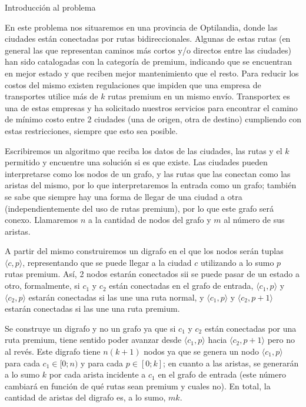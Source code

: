 

\begin{subsection}{Introducción al problema}

En este problema nos situaremos en una provincia de Optilandia, donde las ciudades están conectadas por rutas bidireccionales. Algunas de estas rutas (en general las que representan caminos más cortos y/o directos entre las ciudades) han sido catalogadas con la categoría de premium, indicando que se encuentran en mejor estado y que reciben mejor mantenimiento que el resto. Para reducir los costos del mismo existen regulaciones que impiden que una empresa de transportes utilice más de $k$ rutas premium en un mismo envío. Transportex es una de estas empresas y ha solicitado nuestros servicios para encontrar el camino de mínimo costo entre 2 ciudades (una de origen, otra de destino) cumpliendo con estas restricciones, siempre que esto sea posible.

Escribiremos un algoritmo que reciba los datos de las ciudades, las rutas y el $k$ permitido y encuentre una solución si es que existe. Las ciudades pueden interpretarse como los nodos de un grafo, y las rutas que las conectan como las aristas del mismo, por lo que interpretaremos la entrada como un grafo; también se sabe que siempre hay una forma de llegar de una ciudad a otra (independientemente del uso de rutas premium), por lo que este grafo será conexo. Llamaremos $n$ a la cantidad de nodos del grafo y $m$ al número de sus aristas. 

A partir del mismo construiremos un digrafo en el que los nodos serán tuplas  $\langle c, p \rangle$, representando que se puede llegar a la ciudad $c$ utilizando a lo sumo $p$ rutas premium. As\'{i}, 2 nodos estar\'{a}n conectados sii se puede pasar de un estado a otro, formalmente,  si $c_1$ y $c_2$ est\'{a}n conectadas en el grafo de entrada, $\langle c_1, p \rangle$ y $\langle c_2, p \rangle$ estar\'{a}n conectadas si las une una ruta normal, y $\langle c_1, p \rangle$ y $\langle c_2, p + 1\rangle$ estar\'{a}n conectadas si las une una ruta premium. 

Se construye un digrafo y no un grafo ya que si $c_1$ y $c_2$ est\'{a}n conectadas por una ruta premium, tiene sentido poder avanzar desde $\langle c_1, p \rangle$ hacia $\langle c_2, p+1 \rangle$ pero no al rev\'{e}s. Este digrafo tiene $n(k+1)$ nodos ya que se genera un nodo $\langle c_1, p \rangle$ para cada $c_1 \in [0; n)$ y para cada $p \in [0; k]$; en cuanto a las aristas, se generarán a lo sumo $k$ por cada arista incidente a $c_1$ en el grafo de entrada (este número cambiará en función de qué rutas sean premium y cuales no). En total, la cantidad de aristas del digrafo es, a lo sumo, $mk$.


\end{subsection}
